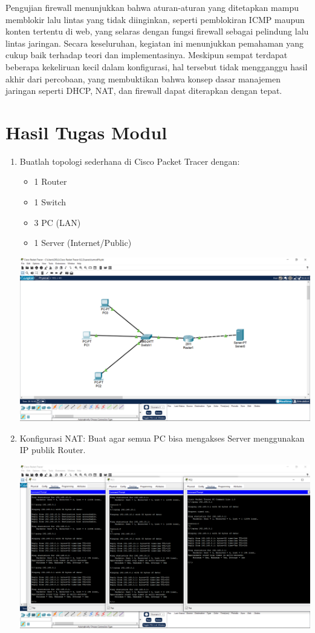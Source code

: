 Pengujian firewall menunjukkan bahwa aturan-aturan yang ditetapkan mampu memblokir lalu lintas yang tidak diinginkan, seperti pemblokiran ICMP maupun konten tertentu di web, yang selaras dengan fungsi firewall sebagai pelindung lalu lintas jaringan. Secara keseluruhan, kegiatan ini menunjukkan pemahaman yang cukup baik terhadap teori dan implementasinya. Meskipun sempat terdapat beberapa kekeliruan kecil dalam konfigurasi, hal tersebut tidak mengganggu hasil akhir dari percobaan, yang membuktikan bahwa konsep dasar manajemen jaringan seperti DHCP, NAT, dan firewall dapat diterapkan dengan tepat.
\section{Hasil Tugas Modul}
\begin{enumerate}
    \item Buatlah topologi sederhana di Cisco Packet Tracer dengan:
    \begin{itemize}
        \item 1 Router
        \item 1 Switch
        \item 3 PC (LAN)
        \item 1 Server (Internet/Public)
    \end{itemize}
    \begin{center}
        \includegraphics[scale=0.2]{P1/img/25.png}
    \end{center}

    \item Konfigurasi NAT: Buat agar semua PC bisa mengakses Server menggunakan IP publik Router.
    \begin{center}
        \includegraphics[scale=0.2]{P1/img/23.png}
    \end{center}


\end{enumerate}
